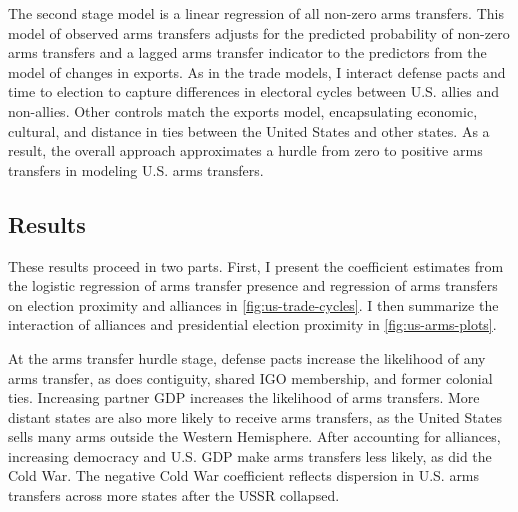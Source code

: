 \documentclass[12pt]{article}
\begin{document}
The second stage model is a linear regression of all non-zero arms transfers.
This model of observed arms transfers adjusts for the predicted probability of non-zero arms transfers and a lagged arms transfer indicator to the predictors from the model of changes in exports.
As in the trade models, I interact defense pacts and time to election to capture differences in electoral cycles between U.S. allies and non-allies. 
Other controls match the exports model, encapsulating economic, cultural, and distance in ties between the United States and other states. 
As a result, the overall approach approximates a hurdle from zero to positive arms transfers in modeling U.S. arms transfers.


\subsection{Results}


These results proceed in two parts.
First, I present the coefficient estimates from the logistic regression of arms transfer presence and regression of arms transfers on election proximity and alliances in \autoref{fig:us-trade-cycles}.
I then summarize the interaction of alliances and presidential election proximity in \autoref{fig:us-arms-plots}.


At the arms transfer hurdle stage, defense pacts increase the likelihood of any arms transfer, as does contiguity, shared IGO membership, and former colonial ties.
Increasing partner GDP increases the likelihood of arms transfers.
More distant states are also more likely to receive arms transfers, as the United States sells many arms outside the Western Hemisphere. 
After accounting for alliances, increasing democracy and U.S. GDP make arms transfers less likely, as did the Cold War. 
The negative Cold War coefficient reflects dispersion in U.S. arms transfers across more states after the USSR collapsed.
\end{document}
